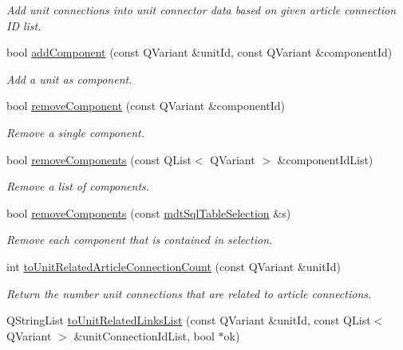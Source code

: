 \begin{DoxyCompactItemize}
\begin{DoxyCompactList}\small\item\em Add unit connections into unit connector data based on given article connection I\-D list. \end{DoxyCompactList}\item 
bool \hyperlink{classmdt_cl_unit_a2315532b648609910541e739a4217014}{add\-Component} (const Q\-Variant \&unit\-Id, const Q\-Variant \&component\-Id)
\begin{DoxyCompactList}\small\item\em Add a unit as component. \end{DoxyCompactList}\item 
bool \hyperlink{classmdt_cl_unit_aab0bc86d8ebbcd9ea1124c4e584a1fbf}{remove\-Component} (const Q\-Variant \&component\-Id)
\begin{DoxyCompactList}\small\item\em Remove a single component. \end{DoxyCompactList}\item 
bool \hyperlink{classmdt_cl_unit_a767070e07954eaf7247f26f777644f1c}{remove\-Components} (const Q\-List$<$ Q\-Variant $>$ \&component\-Id\-List)
\begin{DoxyCompactList}\small\item\em Remove a list of components. \end{DoxyCompactList}\item 
bool \hyperlink{classmdt_cl_unit_afb028e79c63e2e649c3108bab60058a3}{remove\-Components} (const \hyperlink{classmdt_sql_table_selection}{mdt\-Sql\-Table\-Selection} \&s)
\begin{DoxyCompactList}\small\item\em Remove each component that is contained in selection. \end{DoxyCompactList}\item 
int \hyperlink{classmdt_cl_unit_aaa3bba512c75d0358283e25723abf2f9}{to\-Unit\-Related\-Article\-Connection\-Count} (const Q\-Variant \&unit\-Id)
\begin{DoxyCompactList}\small\item\em Return the number unit connections that are related to article connections. \end{DoxyCompactList}\item 
Q\-String\-List \hyperlink{classmdt_cl_unit_a44ffa59c9588ca5afed64e8b1d94262c}{to\-Unit\-Related\-Links\-List} (const Q\-Variant \&unit\-Id, const Q\-List$<$ Q\-Variant $>$ \&unit\-Connection\-Id\-List, bool $\ast$ok)

\end{DoxyCompactItemize}
